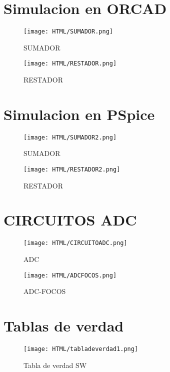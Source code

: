 \documentclass[11pt,a4paper]{article}
\begin{document}
\newpage 
\section{Simulacion en ORCAD}
\begin{figure}[h]
\centering
\texttt{[image: HTML/SUMADOR.png]} 
\caption{SUMADOR}
\end{figure}

\begin{figure}[h]
\centering
\texttt{[image: HTML/RESTADOR.png]}  
\caption{RESTADOR}
\end{figure}

\newpage 

\section{Simulacion en PSpice}

\begin{figure}[h]
\centering
\texttt{[image: HTML/SUMADOR2.png]} 
\caption{SUMADOR}
\end{figure}

\begin{figure}[h]
\centering
\texttt{[image: HTML/RESTADOR2.png]} 
\caption{RESTADOR}
\end{figure}

\newpage 

\section{CIRCUITOS ADC}

\begin{figure}[h]
\centering
\texttt{[image: HTML/CIRCUITOADC.png]} 
\caption{ADC}
\end{figure}

\begin{figure}[h]
\centering
\texttt{[image: HTML/ADCFOCOS.png]} 
\caption{ADC-FOCOS}
\end{figure}

\newpage 

\section{Tablas de verdad}

\begin{figure}[h]
\centering
\texttt{[image: HTML/tabladeverdad1.png]}   
\caption{Tabla de verdad SW}
\end{figure}
\end{document}
